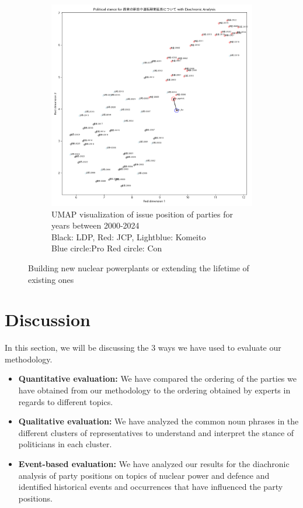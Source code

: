 \documentclass[final,5p,times,twocolumn,authoryear]{elsarticle}
\begin{document}
\begin{figure}[h]
\begin{subfigure}{0.48\textwidth}
		  \includegraphics[width=\textwidth]{figs/results/diachronic_nuclear/newplants_diachronic_umap.png}
		  \caption{UMAP visualization of issue position of parties for years between 2000-2024\\\hspace{\textwidth} 
		  Black: LDP, Red: JCP, Lightblue: Komeito\\\hspace{\textwidth}
		  Blue circle:Pro Red circle: Con}
		  \label{fig:sub2}
		\end{subfigure}
	\caption{Building new nuclear powerplants or extending the lifetime of existing ones}
	\label{fig: results-diachronic-nuclear-new}
\end{figure}

\clearpage
\twocolumn

\section{Discussion}
In this section, we will be discussing the 3 ways we have used to evaluate our methodology. 
\begin{itemize}
	\item \textbf{Quantitative evaluation:} We have compared the ordering of the parties we have obtained from our methodology to the ordering obtained by experts in regards to different topics. 
	\item \textbf{Qualitative evaluation:} We have analyzed the common noun phrases in the different clusters of representatives to understand and interpret the stance of politicians in each cluster. 
	\item \textbf{Event-based evaluation:} We have analyzed our results for the diachronic analysis of party positions on topics of nuclear power and defence and identified historical events and occurrences that have influenced the party positions.
\end{itemize}
\end{document}
